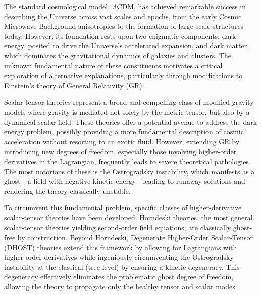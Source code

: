 \documentclass[twocolumn]{aastex631}
\begin{document}
The standard cosmological model, $\Lambda$CDM, has achieved remarkable success in describing the Universe across vast scales and epochs, from the early Cosmic Microwave Background anisotropies to the formation of large-scale structures today. However, its foundation rests upon two enigmatic components: dark energy, posited to drive the Universe's accelerated expansion, and dark matter, which dominates the gravitational dynamics of galaxies and clusters. The unknown fundamental nature of these constituents motivates a critical exploration of alternative explanations, particularly through modifications to Einstein's theory of General Relativity (GR).

Scalar-tensor theories represent a broad and compelling class of modified gravity models where gravity is mediated not solely by the metric tensor, but also by a dynamical scalar field. These theories offer a potential avenue to address the dark energy problem, possibly providing a more fundamental description of cosmic acceleration without resorting to an exotic fluid. However, extending GR by introducing new degrees of freedom, especially those involving higher-order derivatives in the Lagrangian, frequently leads to severe theoretical pathologies. The most notorious of these is the Ostrogradsky instability, which manifests as a ghost—a field with negative kinetic energy—leading to runaway solutions and rendering the theory classically unstable.

To circumvent this fundamental problem, specific classes of higher-derivative scalar-tensor theories have been developed. Horndeski theories, the most general scalar-tensor theories yielding second-order field equations, are classically ghost-free by construction. Beyond Horndeski, Degenerate Higher-Order Scalar-Tensor (DHOST) theories extend this framework by allowing for Lagrangians with higher-order derivatives while ingeniously circumventing the Ostrogradsky instability at the classical (tree-level) by ensuring a kinetic degeneracy. This degeneracy effectively eliminates the problematic ghost degree of freedom, allowing the theory to propagate only the healthy tensor and scalar modes.
\end{document}
